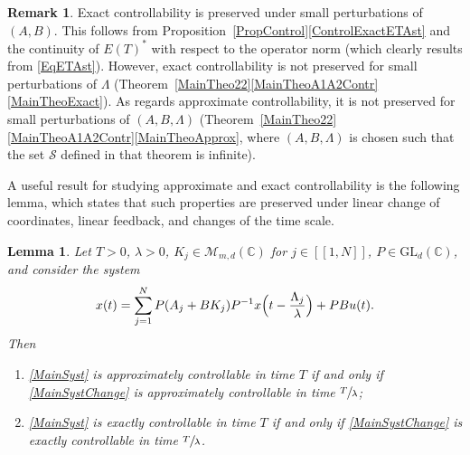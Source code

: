 \documentclass[JEP,XML,SOM,Unicode]{cedram}
\newcommand{\llbracket}{[\![}
\newcommand{\rrbracket}{]\!]}
\theoremstyle{plain}
\newtheorem{lemm}[theo]{Lemma}
\theoremstyle{definition}
\newtheorem{remk}[theo]{Remark}
\begin{document}
\begin{remk}
Exact controllability is preserved under small perturbations of $(A, B)$. This follows from Proposition~\ref{PropControl}\eqref{ControlExactETAst} and the continuity of $E(T)^\ast$ with respect to the operator norm (which clearly results from \eqref{EqETAst}). However, exact controllability is not preserved for small perturbations of $\Lambda$ (\cf Theorem~\ref{MainTheo22}\eqref{MainTheoA1A2Contr}\eqref{MainTheoExact}). As regards approximate controllability, it is not preserved for small perturbations of $(A, B, \Lambda)$ (\cf Theorem~\ref{MainTheo22}\eqref{MainTheoA1A2Contr}\eqref{MainTheoApprox}, where $(A, B, \Lambda)$ is chosen such that the set $\mathcal S$ defined in that theorem is infinite).
\end{remk}

A useful result for studying approximate and exact controllability is the following lem\-ma, which states that such properties are preserved under linear change of coordinates, linear feedback, and changes of the time scale.

\begin{lemm}
\label{LemmControlDelayInvariant}
Let $T > 0$, $\lambda > 0$, $K_j \in \mathcal M_{m, d}(\mathbb C)$ for $j \in \llbracket 1, N\rrbracket$, $P \in \mathrm{GL}_d(\mathbb C)$, and consider the system
\begin{equation}
\label{MainSystChange}
x(t) = \sum_{j=1}^N P(A_j + B K_j) P^{-1} x\Bigl(t - \frac{\Lambda_j}{\lambda}\Bigr) + P B u(t).
\end{equation}
Then
\begin{enumerate}
\item\label{ApproxContrlIff} \eqref{MainSyst} is approximately controllable in time $T$ if and only if \eqref{MainSystChange} is approximately controllable in time $\sfrac{T}{\lambda}$;

\item\label{ExactContrlIff} \eqref{MainSyst} is exactly controllable in time $T$ if and only if \eqref{MainSystChange} is exactly controllable in time $\sfrac{T}{\lambda}$.
\end{enumerate}
\end{lemm}
\end{document}
